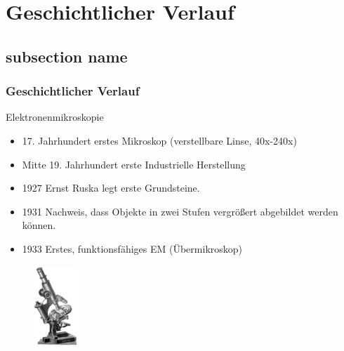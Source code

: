 \section[Geschichte]{Geschichtlicher Verlauf} %
\label{sec:geschichtlicher_verlauf}
\subsection*{subsection name} %
\label{sub:subsection_name}

\begin{frame}
	\frametitle{Geschichtlicher Verlauf}
	\begin{block}{Elektronenmikroskopie}
		\begin{itemize}
			\item 17. Jahrhundert erstes Mikroskop (verstellbare Linse, 40x-240x) 
			\item Mitte 19. Jahrhundert erste Industrielle Herstellung
			\item 1927 Ernst Ruska legt erste Grundsteine.
			\item 1931 Nachweis, dass Objekte in zwei Stufen vergrößert abgebildet werden können.
			\item 1933 Erstes, funktionsfähiges EM (Übermikroskop)
		\end{itemize}
	\end{block}
	\begin{figure}
		\includegraphics[height = 3cm]{pic/mikroskop1.jpg}
	\end{figure}
\end{frame}

